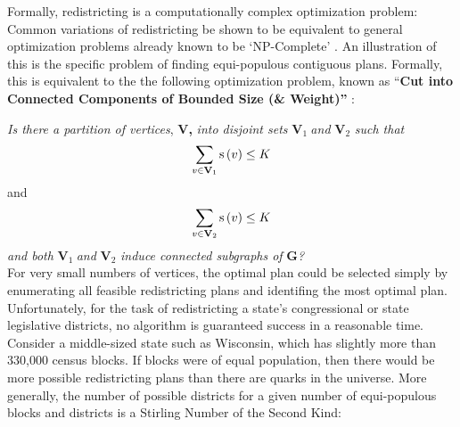 \documentclass[article]{JSSstyle/jss}
\newcommand\textsubscript[1]{\ensuremath{{}_{\text{#1}}}}
\begin{document}
Formally, redistricting is a computationally complex optimization 
problem: Common variations of redistricting be shown to be equivalent to general optimization problems already  known to be `NP-Complete'  \citep[see][]{Altman97}. An illustration of this is the specific problem of finding equi-populous contiguous plans. Formally, this is equivalent to the the following optimization problem, known as
``\textbf{Cut into Connected Components of Bounded Size (\& Weight)''} \citep[][]{Johnson1982}: 

\emph{Is there a partition of vertices}, \textbf{V,}\textit{ } \emph{into disjoint
sets} \textbf{V}\textit{\textsubscript{1 }}\emph{and}
\textbf{V}\textit{\textsubscript{2}} \emph{such that} 
\[
\sum\limits_{v \in {\bf V}_1 } {{\rm s}\left( v \right)}  \le K
\]
 and 
\[
\sum\limits_{v \in {\bf V}_2 } {{\rm s}\left( v \right)}  \le K
\]
\emph{and both}
\textbf{V}\textit{\textsubscript{1 }}\emph{and}
\textbf{V}\textit{\textsubscript{2}} \emph{induce connected subgraphs of}
\textbf{G}\textit{?}
\\
For very small numbers of vertices, the optimal plan could be selected simply by enumerating all feasible redistricting plans and identifing the most optimal plan.  
Unfortunately, for the task of redistricting a state's congressional 
or state legislative districts, no algorithm is guaranteed success 
in a reasonable time.  Consider a middle-sized state such as 
Wisconsin, which has slightly more than 330,000 census blocks.  If 
blocks were of equal population, then there would be more possible redistricting 
plans than there are quarks in the universe.  More generally, the number of
possible districts for a given number of equi-populous blocks and districts 
is a Stirling Number of the Second Kind:
\end{document}
